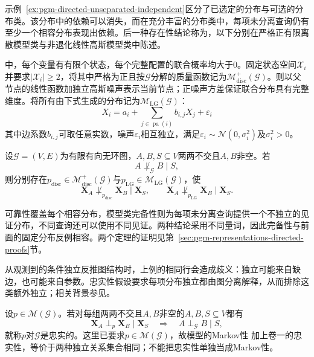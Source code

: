 示例~\ref{ex:pgm-directed-unseparated-independent}区分了已选定的分布与可选的分布类。该分布中的依赖可以消失，而在充分丰富的分布类中，每项未分离查询仍有至少一个相容分布表现出依赖。后一种存在性结论称为，以下分别在严格正有限离散模型类与非退化线性高斯模型类中陈述。

中，每个变量有有限个状态，每个完整配置的联合概率均大于$0$。固定状态空间$\mathcal{X}_i$并要求$|\mathcal{X}_i|\geq2$，将其中严格为正且按$\mathcal{G}$分解的质量函数记为$\mathcal{M}_{\mathrm{disc}}^{+}(\mathcal{G})$。则以父节点的线性函数加独立高斯噪声表示当前节点；正噪声方差保证联合分布具有完整维度。将所有由下式生成的分布记为$\mathcal{M}_{\mathrm{LG}}(\mathcal{G})$：
\[
  X_i=a_i+\sum_{j\in\operatorname{pa}(i)}b_{i,j}X_j+\varepsilon_i
\]
其中边系数$b_{i,j}$可取任意实数，噪声$\varepsilon_i$相互独立，满足$\varepsilon_i\sim\mathcal{N}(0,\sigma_i^2)$及$\sigma_i^2>0$。

\begin{theorem}[d-分离在特定模型类中的完备性]
  \label{thm:pgm-directed-completeness}
  设$\mathcal{G}=(V,E)$为有限有向无环图，$A,B,S\subseteq V$两两不交且$A,B$非空。若
  \[
    A\not\perp_{\mathcal{G}}B\mid S,
  \]
  则分别存在$p_{\mathrm{disc}}\in\mathcal{M}_{\mathrm{disc}}^{+}(\mathcal{G})$与$p_{\mathrm{LG}}\in\mathcal{M}_{\mathrm{LG}}(\mathcal{G})$，使
  \begin{equation}
    \bm{X}_A\not\perp_{p_{\mathrm{disc}}}\bm{X}_B\mid\bm{X}_S,
    \qquad
    \bm{X}_A\not\perp_{p_{\mathrm{LG}}}\bm{X}_B\mid\bm{X}_S.
    \label{eq:pgm-directed-completeness}
  \end{equation}
\end{theorem}

可靠性覆盖每个相容分布，模型类完备性则为每项未分离查询提供一个不独立的见证分布，不同查询还可以使用不同见证。两种结论采用不同量词，因此完备性与前面的固定分布反例相容。两个定理的证明见第~\ref{sec:pgm-representations-directed-proofs}节。

从观测到的条件独立反推图结构时，上例的相同行会造成歧义：独立可能来自缺边，也可能来自参数。忠实性假设要求每项分布独立都由图分离解释，从而排除这类额外独立；相关背景参见。

\begin{definition}[忠实性]
  \label{def:pgm-directed-faithfulness}
  设$p\in\mathcal{M}(\mathcal{G})$。若对每组两两不交且$A,B$非空的$A,B,S\subseteq V$都有
  \[
    \bm{X}_A\perp_p\bm{X}_B\mid\bm{X}_S
    \quad\Longrightarrow\quad
    A\perp_{\mathcal{G}}B\mid S,
  \]
  就称$p$对$\mathcal{G}$是忠实的。这里已要求$p\in\mathcal M(\mathcal G)$，故模型的Markov性
  加上卷一的忠实性，等价于两种独立关系集合相同；不能把忠实性单独当成Markov性。
\end{definition}

